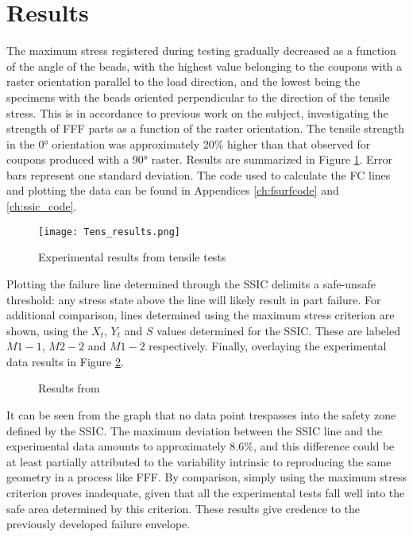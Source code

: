 \documentclass[main.tex]{subfiles}
\begin{document}
\section{Results}\label{sec:results_ssic}

The maximum stress registered during testing gradually decreased as a function of the angle of the beads, with the highest value belonging to the coupons with a raster orientation parallel to the load direction, and the lowest being the specimens with the beads oriented perpendicular to the direction of the tensile stress. This is in accordance to previous work on the subject, investigating the strength of FFF parts as a function of the raster orientation. The tensile strength in the 0° orientation was approximately 20\% higher than that observed for coupons produced with a 90° raster. Results are summarized in Figure \ref{fig:ssic_tens}. Error bars represent one standard deviation. The code used to calculate the FC lines and plotting the data can be found in Appendices \ref{ch:fsurfcode} and \ref{ch:ssic_code}.

\begin{figure}[!htbp]
	\center
	\texttt{[image: Tens\_results.png]}
	\caption{Experimental results from tensile tests}
	\label{fig:ssic_tens}
\end{figure}

Plotting the failure line determined through the SSIC delimits a safe-unsafe threshold: any stress state above the line will likely result in part failure.  For additional comparison, lines determined using the maximum stress criterion are shown, using the $X_t$, $Y_t$ and $S$ values determined for the SSIC. These are labeled $M1-1$, $M2-2$ and $M1-2$ respectively. Finally, overlaying the experimental data results in Figure \ref{fig:jcompscir}.

\begin{figure}[!htbp]
	\center
	\hfill
	\caption{Results from \cite{MazzeiJCompSci}} \label{fig:jcompscir}
\end{figure} 

It can be seen from the graph that no data point trespasses into the safety zone defined by the SSIC. The maximum deviation between the SSIC line and the experimental data amounts to approximately 8.6\%, and this difference could be at least partially attributed to the variability intrinsic to reproducing the same geometry in a process like FFF. By comparison, simply using the maximum stress criterion proves inadequate, given that all the experimental tests fall well into the safe area determined by this criterion. These results give credence to the previously developed failure envelope.
\end{document}
